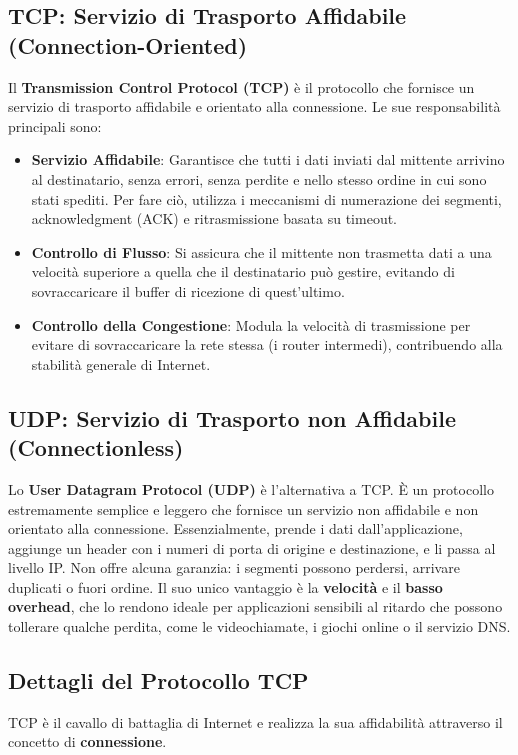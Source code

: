 \subsection{TCP: Servizio di Trasporto Affidabile (Connection-Oriented)}
Il \textbf{Transmission Control Protocol (TCP)} è il protocollo che fornisce un servizio di trasporto affidabile e orientato alla connessione. Le sue responsabilità principali sono:
\begin{itemize}
    \item \textbf{Servizio Affidabile}: Garantisce che tutti i dati inviati dal mittente arrivino al destinatario, senza errori, senza perdite e nello stesso ordine in cui sono stati spediti. Per fare ciò, utilizza i meccanismi di numerazione dei segmenti, acknowledgment (ACK) e ritrasmissione basata su timeout.
    \item \textbf{Controllo di Flusso}: Si assicura che il mittente non trasmetta dati a una velocità superiore a quella che il destinatario può gestire, evitando di sovraccaricare il buffer di ricezione di quest'ultimo.
    \item \textbf{Controllo della Congestione}: Modula la velocità di trasmissione per evitare di sovraccaricare la rete stessa (i router intermedi), contribuendo alla stabilità generale di Internet.
\end{itemize}

\subsection{UDP: Servizio di Trasporto non Affidabile (Connectionless)}
Lo \textbf{User Datagram Protocol (UDP)} è l'alternativa a TCP. È un protocollo estremamente semplice e leggero che fornisce un servizio non affidabile e non orientato alla connessione. Essenzialmente, prende i dati dall'applicazione, aggiunge un header con i numeri di porta di origine e destinazione, e li passa al livello IP. Non offre alcuna garanzia: i segmenti possono perdersi, arrivare duplicati o fuori ordine. Il suo unico vantaggio è la \textbf{velocità} e il \textbf{basso overhead}, che lo rendono ideale per applicazioni sensibili al ritardo che possono tollerare qualche perdita, come le videochiamate, i giochi online o il servizio DNS.

\subsection{Dettagli del Protocollo TCP}
TCP è il cavallo di battaglia di Internet e realizza la sua affidabilità attraverso il concetto di \textbf{connessione}.

